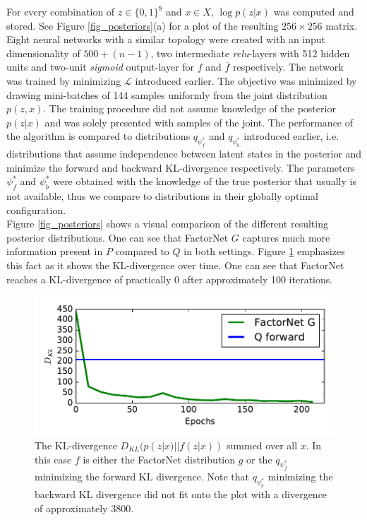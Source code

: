 For every combination of $z \in \{0,1\}^8$ and $x \in X$, $\log p(z|x)$ was computed and stored. See Figure \ref{fig_posteriors}(a) for a plot of the resulting $256 \times 256$ matrix.\\
Eight neural networks with a similar topology were created with an input dimensionality of $500 + (n-1)$, two intermediate \emph{relu}-layers with 512 hidden units and two-unit \emph{sigmoid} output-layer for $f$ and $\overline{f}$ respectively. The network was trained by minimizing $\mathcal{L}$ introduced earlier. The objective was minimized by drawing mini-batches of 144 samples uniformly from the joint distribution $p(z,x)$. The training procedure did not assume knowledge of the posterior $p(z|x)$ and was solely presented with samples of the joint. The performance of the algorithm is compared to distributions $q_{\psi^*_f}$ and $q_{\psi^*_b}$ introduced earlier, i.e. distributions that assume independence between latent states in the posterior and minimize the forward and backward KL-divergence respectively. The parameters $\psi^*_f$ and $\psi^*_b$ were obtained with the knowledge of the true posterior that usually is not available, thus we compare to distributions in their globally optimal configuration.\\
Figure \ref{fig_posteriors} shows a visual comparison of the different resulting posterior distributions. One can see that FactorNet $G$ captures much more information present in $P$ compared to $Q$ in both settings. Figure \ref{fig_epochs} emphasizes this fact as it shows the KL-divergence over time. One can see that FactorNet reaches a KL-divergence of practically 0 after approximately 100 iterations.

\begin{figure}
\centering
\includegraphics[width=0.9\linewidth]{factornet/epochs.pdf}
\caption[FactorNet: KL-divergence as a function of learning epochs]{The KL-divergence $D_{KL}(p(z|x) || f(z|x))$ summed over all $x$. In this case $f$ is either the FactorNet distribution $g$ or the $q_{\psi^*_f}$ minimizing the forward KL divergence. Note that $q_{\psi^*_b}$ minimizing the backward KL divergence did not fit onto the plot with a divergence of approximately $3800$.}
\label{fig_epochs}
\end{figure}



